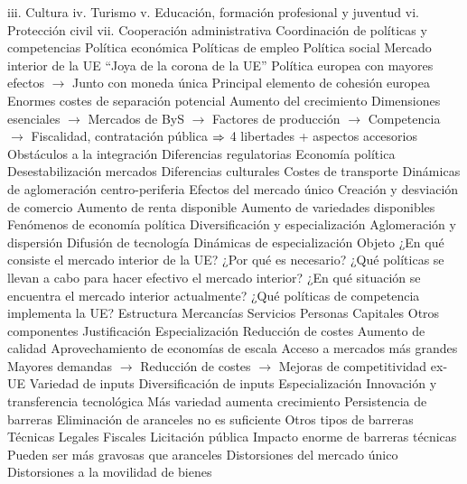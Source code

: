 \documentclass{nuevotema}
\begin{document}
\begin{esquemal}
				\4[] iii. Cultura
				\4[] iv. Turismo
				\4[] v. Educación, formación profesional y juventud
				\4[] vi. Protección civil
				\4[] vii. Cooperación administrativa
				\4 Coordinación de políticas y competencias
				\4[] Política económica
				\4[] Políticas de empleo
				\4[] Política social
			\3 Mercado interior de la UE
				\4 ``Joya de la corona de la UE''
				\4[] Política europea con mayores efectos
				\4[] $\to$ Junto con moneda única
				\4 Principal elemento de cohesión europea
				\4[] Enormes costes de separación potencial
				\4[] Aumento del crecimiento
				\4 Dimensiones esenciales
				\4[] $\to$ Mercados de ByS
				\4[] $\to$ Factores de producción
				\4[] $\to$ Competencia
				\4[] $\to$ Fiscalidad, contratación pública
				\4[] $\then$ 4 libertades + aspectos accesorios
			\3 Obstáculos a la integración
				\4 Diferencias regulatorias
				\4 Economía política
				\4 Desestabilización mercados
				\4 Diferencias culturales
				\4 Costes de transporte
				\4 Dinámicas de aglomeración centro-periferia
			\3 Efectos del mercado único
				\4 Creación y desviación de comercio
				\4 Aumento de renta disponible
				\4 Aumento de variedades disponibles
				\4 Fenómenos de economía política
				\4 Diversificación y especialización
				\4 Aglomeración y dispersión
				\4 Difusión de tecnología
				\4 Dinámicas de especialización
		\2 Objeto
			\3 ¿En qué consiste el mercado interior de la UE?
			\3 ¿Por qué es necesario?
			\3 ¿Qué políticas se llevan a cabo para hacer efectivo el mercado interior?
			\3 ¿En qué situación se encuentra el mercado interior actualmente?
			\3 ¿Qué políticas de competencia implementa la UE?
		\2 Estructura
			\3 Mercancías
			\3 Servicios
			\3 Personas
			\3 Capitales
			\3 Otros componentes
	\1 
		\2 Justificación
			\3 Especialización
				\4 Reducción de costes
				\4 Aumento de calidad
			\3 Aprovechamiento de economías de escala
				\4 Acceso a mercados más grandes
				\4[] Mayores demandas
				\4[] $\to$ Reducción de costes
				\4[] $\to$ Mejoras de competitividad ex-UE
			\3 Variedad de inputs
				\4 Diversificación de inputs
				\4 Especialización
				\4 Innovación y transferencia tecnológica
				\4[$\then$] Más variedad aumenta crecimiento
			\3 Persistencia de barreras
				\4 Eliminación de aranceles no es suficiente
				\4 Otros tipos de barreras
				\4[] Técnicas
				\4[] Legales
				\4[] Fiscales
				\4[] Licitación pública
				\4 Impacto enorme de barreras técnicas
				\4[] Pueden ser más gravosas que aranceles
			\3 Distorsiones del mercado único
				\4 Distorsiones a la movilidad de bienes

\end{esquemal}
\end{document}
